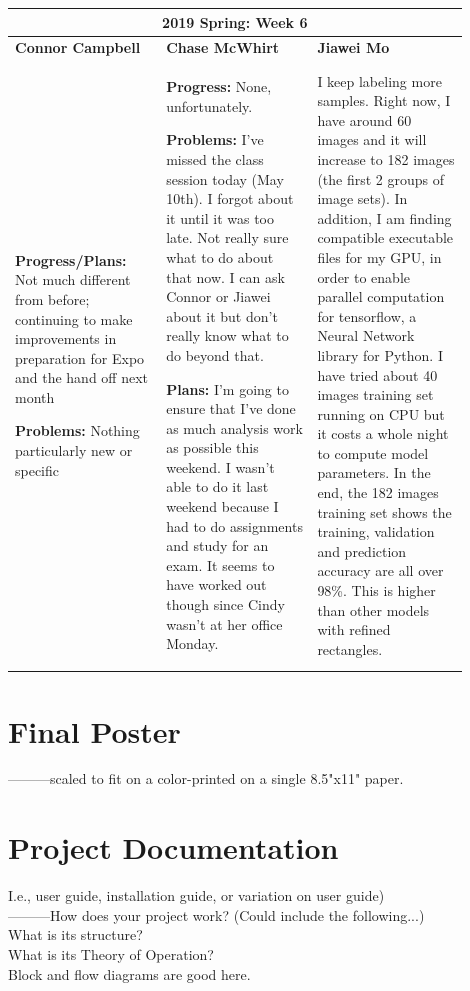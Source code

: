 \documentclass[10pt,journal,compsoc, draftclsnofoot,onecolumn]{IEEEtran}
\begin{document}
\begin{center}
\begin{tabular}{|p{0.3\linewidth}|p{0.3\linewidth}|p{0.3\linewidth}|}
\hline
\multicolumn{3}{|c|}{\textbf{2019 Spring: Week 6}} \\
\hline
\textbf{Connor Campbell} & \textbf{Chase McWhirt} & \textbf{Jiawei Mo} \\ [0.5ex]
\hline\hline

\textbf{Progress/Plans:} Not much different from before; continuing to make improvements in preparation for Expo and the hand off next month

\textbf{Problems:} Nothing particularly new or specific
&
\textbf{Progress:} None, unfortunately.

\textbf{Problems:} I've missed the class session today (May 10th).
I forgot about it until it was too late.
Not really sure what to do about that now.
I can ask Connor or Jiawei about it but don't really know what to do beyond that.

\textbf{Plans:} I'm going to ensure that I've done as much analysis work as possible this weekend.
I wasn't able to do it last weekend because I had to do assignments and study for an exam.
It seems to have worked out though since Cindy wasn't at her office Monday.
&
I keep labeling more samples. Right now, I have around 60 images and it will increase to 182 images (the first 2 groups of image sets). In addition, I am finding compatible executable files for my GPU, in order to enable parallel computation for tensorflow, a Neural Network library for Python. I have tried about 40 images training set running on CPU but it costs a whole night to compute model parameters. In the end, the 182 images training set shows the training, validation and prediction accuracy are all over 98\%. This is higher than other models with refined rectangles.
\\ \hline
\end{tabular}
\end{center}

\newpage
\section{Final Poster}
---------scaled to fit on a color-printed on a single 8.5"x11" paper.

\newpage
\section{Project Documentation}
I.e., user guide, installation guide, or variation on user guide) \\
---------How does your project work? (Could include the following...) \\
What is its structure? \\
What is its Theory of Operation? \\
Block and flow diagrams are good here. \\ \\
\end{document}
